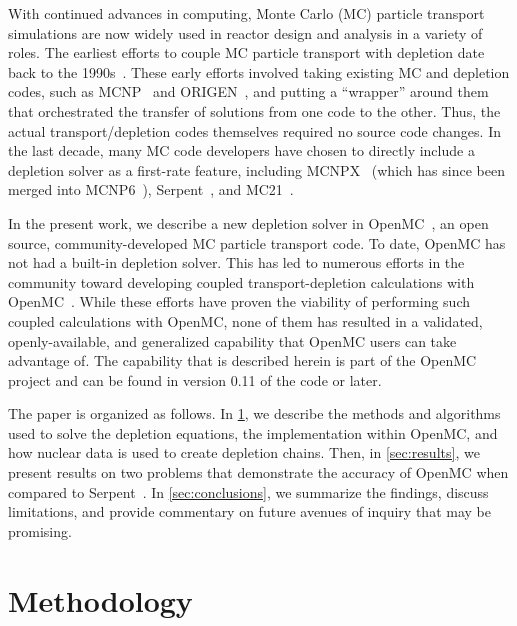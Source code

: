\documentclass[3p,authoryear]{elsarticle}
\begin{document}
With continued advances in computing, Monte Carlo (MC) particle transport
simulations are now widely used in reactor design and analysis in a variety of
roles. The earliest efforts to couple MC particle transport with depletion date
back to the 1990s~\citep{moore1995inel,trellue1998lanl}. These early efforts
involved taking existing MC and depletion codes, such as
MCNP~\citep{goorley2012nt} and ORIGEN~\citep{croff1983nt}, and putting a
``wrapper'' around them that orchestrated the transfer of solutions from one
code to the other. Thus, the actual transport/depletion codes themselves
required no source code changes. In the last decade, many MC code developers
have chosen to directly include a depletion solver as a first-rate feature,
including MCNPX~\citep{waters2007aip} (which has since been merged into
MCNP6~\citep{goorley2012nt}), Serpent~\citep{leppanen2015ane}, and
MC21~\citep{griesheimer2015ane}.

In the present work, we describe a new depletion solver in
OpenMC~\citep{romano2015ane1}, an open source, community-developed MC particle
transport code. To date, OpenMC has not had a built-in depletion solver. This
has led to numerous efforts in the community toward developing coupled
transport-depletion calculations with OpenMC~\citep{gul2017ane,
lanversin2017icone, lanversin2019phd, liu2019nst, zhuang2020pne, zhao2020ned,
zhao2020cpc, zhang2020ane}. While these efforts have proven the viability of
performing such coupled calculations with OpenMC, none of them has resulted in a
validated, openly-available, and generalized capability that OpenMC users can
take advantage of. The capability that is described herein is part of the OpenMC
project and can be found in version 0.11 of the code or later.

The paper is organized as follows. In \cref{sec:methods}, we describe the
methods and algorithms used to solve the depletion equations, the implementation
within OpenMC, and how nuclear data is used to create depletion chains. Then, in
\cref{sec:results}, we present results on two problems that demonstrate the
accuracy of OpenMC when compared to Serpent~\citep{leppanen2015ane}. In
\cref{sec:conclusions}, we summarize the findings, discuss limitations, and
provide commentary on future avenues of inquiry that may be promising.

\section{Methodology}
\label{sec:methods}
\end{document}
